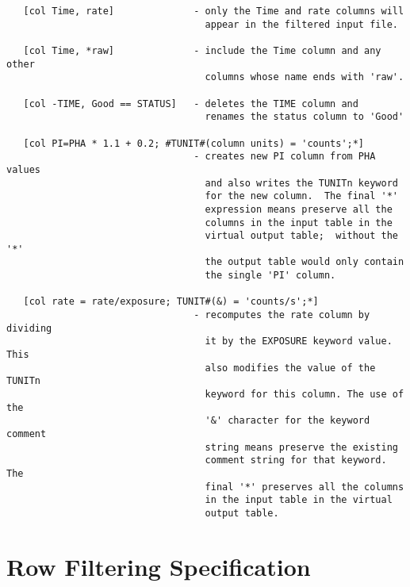 \documentclass[11pt]{book}
\begin{document}
\begin{verbatim}
   [col Time, rate]              - only the Time and rate columns will
                                   appear in the filtered input file.

   [col Time, *raw]              - include the Time column and any other
                                   columns whose name ends with 'raw'.

   [col -TIME, Good == STATUS]   - deletes the TIME column and
                                   renames the status column to 'Good'

   [col PI=PHA * 1.1 + 0.2; #TUNIT#(column units) = 'counts';*]
                                 - creates new PI column from PHA values
                                   and also writes the TUNITn keyword
                                   for the new column.  The final '*'
                                   expression means preserve all the
                                   columns in the input table in the
                                   virtual output table;  without the '*'
                                   the output table would only contain
                                   the single 'PI' column.

   [col rate = rate/exposure; TUNIT#(&) = 'counts/s';*]
                                 - recomputes the rate column by dividing
                                   it by the EXPOSURE keyword value. This
                                   also modifies the value of the TUNITn
                                   keyword for this column. The use of the
                                   '&' character for the keyword comment
                                   string means preserve the existing
                                   comment string for that keyword. The
                                   final '*' preserves all the columns
                                   in the input table in the virtual
                                   output table.
\end{verbatim}


\section{Row Filtering Specification}
\end{document}
